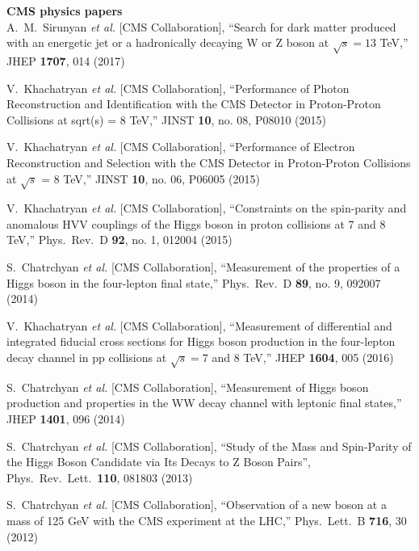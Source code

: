         {\bf CMS physics papers}
        \\    

  A.~M.~Sirunyan {\it et al.} [CMS Collaboration],
  ``Search for dark matter produced with an energetic jet or a hadronically decaying W or Z boson at $ \sqrt{s}=13 $ TeV,''
  JHEP {\bf 1707}, 014 (2017)

  V.~Khachatryan {\it et al.} [CMS Collaboration],
  ``Performance of Photon Reconstruction and Identification with the CMS Detector in Proton-Proton Collisions at sqrt(s) = 8 TeV,''
  JINST {\bf 10}, no. 08, P08010 (2015)

  V.~Khachatryan {\it et al.} [CMS Collaboration],
  ``Performance of Electron Reconstruction and Selection with the CMS Detector in Proton-Proton Collisions at $\sqrt{s}$ = 8  TeV,''
  JINST {\bf 10}, no. 06, P06005 (2015)

  V.~Khachatryan {\it et al.} [CMS Collaboration],
  ``Constraints on the spin-parity and anomalous HVV couplings of the Higgs boson in proton collisions at 7 and 8 TeV,''
  Phys.\ Rev.\ D {\bf 92}, no. 1, 012004 (2015)

  S.~Chatrchyan {\it et al.} [CMS Collaboration],
  ``Measurement of the properties of a Higgs boson in the four-lepton final state,''
  Phys.\ Rev.\ D {\bf 89}, no. 9, 092007 (2014)

  V.~Khachatryan {\it et al.} [CMS Collaboration],
  ``Measurement of differential and integrated fiducial cross sections for Higgs boson production in the four-lepton decay channel in pp collisions at $ \sqrt{s}=7 $ and 8 TeV,''
  JHEP {\bf 1604}, 005 (2016)

  S.~Chatrchyan {\it et al.} [CMS Collaboration],
  ``Measurement of Higgs boson production and properties in the WW decay channel with leptonic final states,''
  JHEP {\bf 1401}, 096 (2014)

  S.~Chatrchyan {\it et al.}  [CMS Collaboration],
  ``Study of the Mass and Spin-Parity of the Higgs Boson Candidate via Its Decays to Z Boson Pairs'',
  Phys.\ Rev.\ Lett.\  {\bf 110}, 081803 (2013)

  S.~Chatrchyan {\it et al.}  [CMS Collaboration],
  ``Observation of a new boson at a mass of 125 GeV with the CMS experiment at the LHC,''
  Phys.\ Lett.\ B {\bf 716}, 30 (2012)

